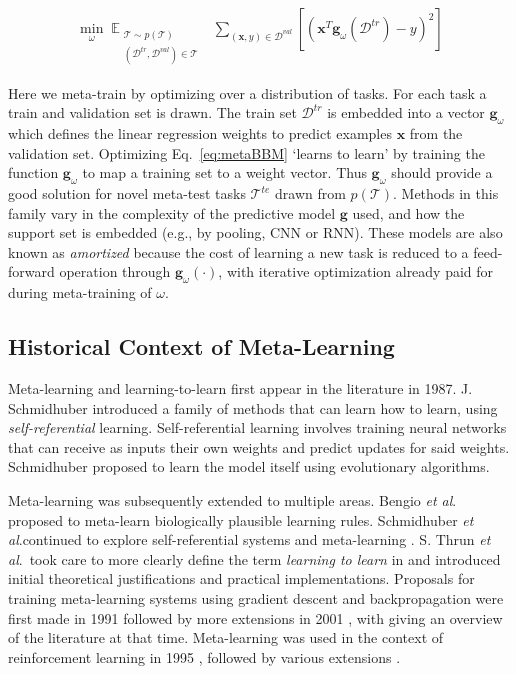 \documentclass[10pt,journal,compsoc]{IEEEtran}
\DeclareMathOperator*{\E}{\mathbb{E}}
\newcommand{\etal}{\textit{et al}.}
\begin{document}
\begin{align}
\label{eq:metaBBM}
 \min_\omega \E_{\substack{
\mathcal{T}\sim p(\mathcal{T})\\
(\mathcal{D}^{tr},\mathcal{D}^{val})\in \mathcal{T}}}~~\sum_{(\mathbf{x},y)\in\mathcal{D}^{val}}\left[ (\mathbf{x}^T \mathbf{g}_\omega(\mathcal{D}^{tr})-y)^2\right]
\end{align}

\noindent Here we meta-train by optimizing over a distribution of tasks. For each task a train and validation set is drawn. The train set $\mathcal{D}^{tr}$ is embedded \cite{zaheer2017deepSet} into a vector $\mathbf{g}_\omega$ which defines the linear regression weights to predict examples $\mathbf{x}$ from the validation set. Optimizing Eq.~\ref{eq:metaBBM} `learns  to learn' by training the function $\mathbf{g}_\omega$ to map a training set to a weight vector. Thus $\mathbf{g}_\omega$ should provide a good solution for novel meta-test tasks $\mathcal{T}^{te}$ drawn from $p(\mathcal{T})$. Methods in this family vary in the complexity of the predictive model $\mathbf{g}$ used, and how the support set is embedded \cite{zaheer2017deepSet} (e.g., by pooling, CNN or RNN). These models are also known as \emph{amortized} \cite{gordon2018metaprobainference} because the cost of learning a new task is reduced to a feed-forward operation through $\mathbf{g}_\omega(\cdot)$, with iterative optimization already paid for during meta-training of $\omega$. 


\subsection{Historical Context of Meta-Learning}
Meta-learning and learning-to-learn first appear in the literature in 1987\cite{schmidhuber1987evolutionary}. J. Schmidhuber introduced a family of methods that can learn how to learn, using \emph{self-referential} learning. Self-referential learning involves training neural networks that can receive as inputs their own weights and predict updates for said weights. Schmidhuber proposed to learn the model itself using evolutionary algorithms. 



Meta-learning was subsequently extended to multiple areas. Bengio \etal \cite{bengio1990learning,bengio1995} proposed to meta-learn biologically plausible learning rules. Schmidhuber \etal continued to explore self-referential systems and meta-learning \cite{schmidhuber1996simple,schmidhuber1993neural}. S. Thrun \etal~took care to more clearly define the term \emph{learning to learn} in \cite{thrun1998learning} and introduced initial theoretical justifications and practical implementations. 
Proposals for training meta-learning systems using gradient descent and backpropagation were first made in 1991 \cite{schmidhuber1991possibility} followed by more extensions in 2001 \cite{hochreiter2001learning,younger2001meta}, with \cite{vilalta2002perspective} giving an overview of the literature at that time. Meta-learning was used in the context of reinforcement learning in 1995 \cite{storck1995reinforcement}, followed by various extensions \cite{wiering1998efficient, schweighofer2003meta}. 
\end{document}
